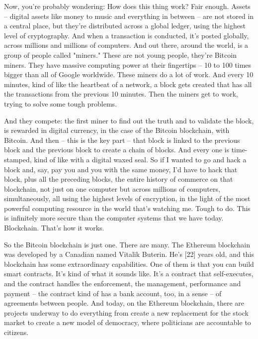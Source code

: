 \documentclass[a4paper]{article}
\begin{document}
Now, you're probably wondering: How does this thing work? Fair enough. Assets -- digital assets like money to music and everything in between -- are not stored in a central place, but they're distributed across a global ledger, using the highest level of cryptography. And when a transaction is conducted, it's posted globally, across millions and millions of computers. And out there, around the world, is a group of people called "miners." These are not young people, they're Bitcoin miners. They have massive computing power at their fingertips -- 10 to 100 times bigger than all of Google worldwide. These miners do a lot of work. And every 10 minutes, kind of like the heartbeat of a network, a block gets created that has all the transactions from the previous 10 minutes. Then the miners get to work, trying to solve some tough problems.

And they compete: the first miner to find out the truth and to validate the block, is rewarded in digital currency, in the case of the Bitcoin blockchain, with Bitcoin. And then -- this is the key part -- that block is linked to the previous block and the previous block to create a chain of blocks. And every one is time-stamped, kind of like with a digital waxed seal. So if I wanted to go and hack a block and, say, pay you and you with the same money, I'd have to hack that block, plus all the preceding blocks, the entire history of commerce on that blockchain, not just on one computer but across millions of computers, simultaneously, all using the highest levels of encryption, in the light of the most powerful computing resource in the world that's watching me. Tough to do. This is infinitely more secure than the computer systems that we have today. Blockchain. That's how it works.

So the Bitcoin blockchain is just one. There are many. The Ethereum blockchain was developed by a Canadian named Vitalik Buterin. He's [22] years old, and this blockchain has some extraordinary capabilities. One of them is that you can build smart contracts. It's kind of what it sounds like. It's a contract that self-executes, and the contract handles the enforcement, the management, performance and payment -- the contract kind of has a bank account, too, in a sense -- of agreements between people. And today, on the Ethereum blockchain, there are projects underway to do everything from create a new replacement for the stock market to create a new model of democracy, where politicians are accountable to citizens.
\end{document}
